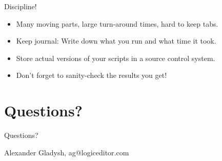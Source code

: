\documentclass[handout]{beamer}
\begin{document}
\begin{frame}{Discipline!}

\begin{itemize}
\item Many moving parts, large turn-around times, hard to keep tabs.
\item Keep journal: Write down what you run and what time it took.
\item Store actual versions of your scripts in a source control system.
\item Don't forget to sanity-check the results you get!
\end{itemize}

\end{frame}


\section{Questions?}


\begin{frame}{Questions?}

Alexander Gladysh,
ag@logiceditor.com

\end{frame}

\end{document}
